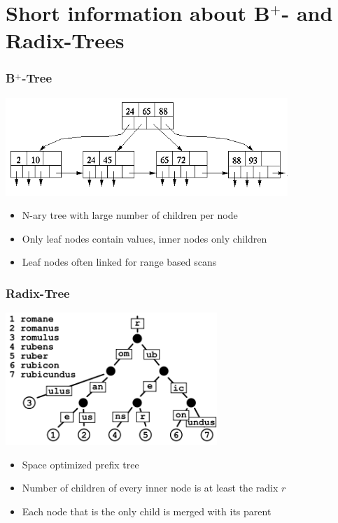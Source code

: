 \documentclass{beamer}
\begin{document}
\section{Short information about B$^{+}$- and Radix-Trees}
\begin{frame}
\frametitle{B$^{+}$-Tree}
	\begin{center}
		\includegraphics[width=0.8\textwidth]{img/b_tree.png}
	\end{center}
	\begin{itemize}
		\item N-ary tree with large number of children per node
		\item Only leaf nodes contain values, inner nodes only children
		\item Leaf nodes often linked for range based scans
	\end{itemize}
\end{frame}
\begin{frame}
\frametitle{Radix-Tree}
	\begin{center}
	\includegraphics[width=0.6\textwidth]{img/radix_tree.png}
	\end{center}
	\begin{itemize}
		\item Space optimized prefix tree
		\item Number of children of every inner node is at least the radix $r$
		\item Each node that is the only child is merged with its parent
	\end{itemize}

\end{frame}
\end{document}
